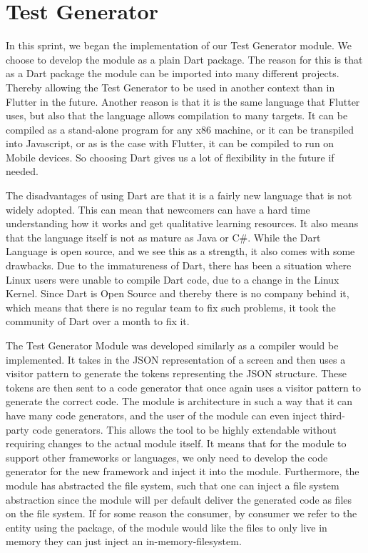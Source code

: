 \section{Test Generator}
In this sprint, we began the implementation of our Test Generator module. 
We choose to develop the module as a plain Dart package. 
The reason for this is that as a Dart package the module can be imported into many different projects.
Thereby allowing the Test Generator to be used in another context than in Flutter in the future.
Another reason is that it is the same language that Flutter uses, but also that the language allows compilation to many targets.
It can be compiled as a stand-alone program for any x86 machine, or it can be transpiled into Javascript, or as is the case with Flutter, it can be compiled to run on Mobile devices. 
So choosing Dart gives us a lot of flexibility in the future if needed.

The disadvantages of using Dart are that it is a fairly new language that is not widely adopted.
This can mean that newcomers can have a hard time understanding how it works and get qualitative learning resources.
It also means that the language itself is not as mature as Java or C\#.
While the Dart Language is open source, and we see this as a strength, it also comes with some drawbacks. 
Due to the immatureness of Dart, there has been a situation where Linux users were unable to compile Dart code, due to a change in the Linux Kernel. 
Since Dart is Open Source and thereby there is no company behind it, which means that there is no regular team to fix such problems, it took the community of Dart over a month to fix it.

The Test Generator Module was developed similarly as a compiler would be implemented.
It takes in the JSON representation of a screen and then uses a visitor pattern to generate the tokens representing the JSON structure.
These tokens are then sent to a code generator that once again uses a visitor pattern to generate the correct code.
The module is architecture in such a way that it can have many code generators, and the user of the module can even inject third-party code generators.
This allows the tool to be highly extendable without requiring changes to the actual module itself.
It means that for the module to support other frameworks or languages, we only need to develop the code generator for the new framework and inject it into the module.
Furthermore, the module has abstracted the file system, such that one can inject a file system abstraction since the module will per default deliver the generated code as files on the file system. If for some reason the consumer, by consumer we refer to the entity using the package, of the module would like the files to only live in memory they can just inject an in-memory-filesystem.

